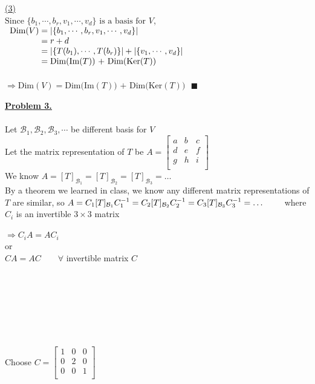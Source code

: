 \documentclass[12pt]{article}
\renewcommand{\qed}{\hfill$\blacksquare$}
\begin{document}
\hyperlink{toc}{\hypertarget{2.3}{(3) }}\\
$\text{Since }\{b_1, \cdots ,b_r,v_1,\cdots ,v_d\} \text{ is a basis for } V$, \\
$\begin{array}{r@{}>{\displaystyle}ll}
		\text{Dim$(V)$} & {}= |\{b_1, \cdots ,b_r,v_1,\cdots ,v_d\}|               & \\
		                & {}=  r + d                                               & \\
		                & {}=|\{T(b_1), \cdots , T(b_r)\}| + |\{v_1,\cdots ,v_d\}| & \\
		                & {}=  \text{Dim(Im$(T)$) + Dim(Ker$(T)$) }                & \\
	\end{array}$
\\\\
$\Longrightarrow \text{Dim$(V)$} = \text{Dim(Im$(T)$) + Dim(Ker$(T)$) }$ \qed

\newpage
\noindent\hyperlink{toc}{\hypertarget{3}{{\LARGE \noindent \underline{\textbf{Problem 3.}}}}}
\\\\
Let $\mathcal{B}_1, \mathcal{B}_2,\mathcal{B}_3, \cdots$ be different basis for $V$\\
Let the matrix representation of $T$ be $A = \begin{bmatrix}
		a & b & c \\
		d & e & f \\
		g & h & i \\
	\end{bmatrix}$\\
We know $A=[T]_{\mathcal{B}_1} =[T]_{\mathcal{B}_2} =[T]_{\mathcal{B}_3}=\ldots$\\
By a theorem we learned in class, we know any different matrix representations of $T$ are similar, so
$A= C_1[T]_{\mathcal{B}_1}C_1^{-1} =C_2[T]_{\mathcal{B}_2}C_2^{-1} =C_3[T]_{\mathcal{B}_3}C_3^{-1} = \ldots\\ \qquad $ where $C_i$ is an invertible $3\times 3$ matrix
\\\\
$\Longrightarrow C_iA=AC_i$\\
or\\
$CA=AC \qquad \forall$ invertible matrix $C$
\\\\\\\\\\\\\\\\
Choose $C = \begin{bmatrix}
		1 & 0 & 0 \\
		0 & 2 & 0 \\
		0 & 0 & 1 \\
	\end{bmatrix}$
\end{document}
